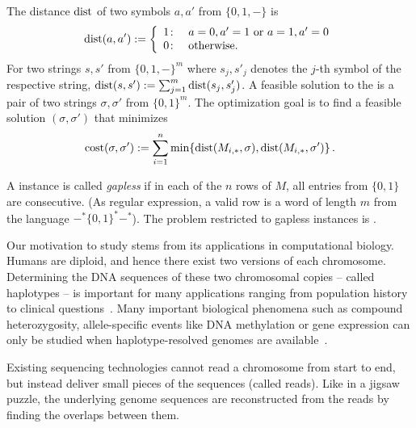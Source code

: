 The distance $\mathrm{dist}$ of two symbols $a,a'$ from $\{0,1,-\}$ is
\[
    \mathrm{dist}(a,a') := \left\{
        \begin{array}{ll}
            1\colon & a=0,a'=1 \mbox{ or } a=1, a'=0\\ 
            0\colon & \mbox{otherwise.}
        \end{array}
    \right.
\]
For two strings $s,s'$ from $\{0,1,-\}^m$ where $s_j, s'_j$ denotes the $j$-th symbol of the respective string, $\mathrm{dist}(s,s') := \sum_{j=1}^m \mathrm{dist}(s_j,s'_j)$.
A feasible solution to the \MEC is a pair of two strings $\sigma,\sigma'$ from $\{0,1\}^m$.
The optimization goal is to find a feasible solution $(\sigma,\sigma')$ that minimizes
\[
    \mathrm{cost}(\sigma,\sigma') := \sum_{i=1}^{n} \min\{\mathrm{dist}(M_{i,*},\sigma), \mathrm{dist}(M_{i,*},\sigma')\}\,.
\]

A \MEC instance is called \emph{gapless} if in each of the $n$ rows of $M$, all entries from $\{0,1\}$ are consecutive. 
(As regular expression, a valid row is a word of length $m$ from the language $-^*\{0,1\}^*-^*$).
The \MEC problem restricted to gapless instances is \GMEC.

Our motivation to study \GMEC stems from its applications in computational biology.
Humans are diploid, and hence there exist two versions of each chromosome.
Determining the DNA sequences of these two chromosomal copies -- called haplotypes -- is important for many applications ranging from population history to clinical questions~\cite{snyder2015haplotype, tewhey2011importance}. 
Many important biological phenomena such as compound heterozygosity, allele-specific events like DNA methylation or gene expression can only be studied when haplotype-resolved genomes are available~\cite{leung2015integrative}. 

Existing sequencing technologies cannot read a chromosome from start to end, but instead deliver small pieces of the sequences (called reads). 
Like in a jigsaw puzzle, the underlying genome sequences are reconstructed from the reads by finding the overlaps between them.


